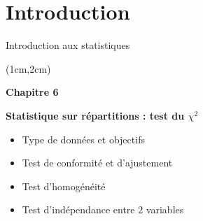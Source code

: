 \documentclass{beamer}
\begin{document}
 
\section{Introduction}
\begin{frame}{Introduction aux statistiques}
\begin{textblock*}{\textwidth}(1cm,2cm)

\begin{center}{\bf \Large Chapitre 6} \end{center}
\begin{center}{\bf \Large Statistique sur répartitions : test du $\chi^2$} \end{center}
\vspace{0.5cm}
\begin{itemize}
\item Type de données et objectifs
\item Test de conformité et d'ajustement
\item Test d'homogénéité
\item Test d'indépendance entre 2 variables
\end{itemize}

 \end{textblock*}

\end{frame}


\end{document}
